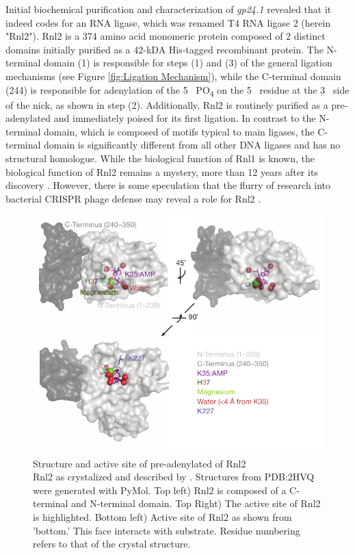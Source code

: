 Initial biochemical purification and characterization of \textit{gp24.1} \citep{Ho2002b} revealed that it indeed codes for an RNA ligase, which was renamed T4 RNA ligase 2 (herein "Rnl2"). Rnl2 is a 374 amino acid monomeric protein composed of 2 distinct domains initially purified as a 42-kDA His-tagged recombinant protein. The N-terminal domain (1) is responsible for steps (1) and (3) of the general ligation mechanisms (see Figure \ref{fig:Ligation Mechanism}), while the C-terminal domain (244) is responsible for adenylation of the 5\textprime~ PO\textsubscript{4} on the 5\textprime~ residue at the 3\textprime~ side of the nick, as shown in step (2). Additionally, Rnl2 is routinely purified as a pre-adenylated and immediately poised for its first ligation. In contrast to the N-terminal domain, which is composed of motifs typical to main ligases, the C-terminal domain is significantly	different from all other DNA ligases and has no structural homologue. While the biological function of Rnl1 is known, the biological function of Rnl2 remains a mystery, more than 12 years after its discovery \citep{Chauleau2013b}. However, there is some speculation that the flurry of research into bacterial CRISPR phage defense may reveal a role for Rnl2 \citep{Barrangou2007c,Chauleau2013b}.

\begin{figure}[htbp]
	\centering 
	\includegraphics{Figures/Rnl2_Structure.pdf}
	\caption[Structure and active site of pre-adenylated of Rnl2]
	{
		Structure and active site of pre-adenylated of Rnl2\\[0.25cm]
		Rnl2 as crystalized and described by \citep{Nandakumar2006}. Structures from PDB:2HVQ were generated with PyMol. Top left) Rnl2 is composed of a C-terminal and N-terminal domain. Top Right) The active site of Rnl2 is highlighted. Bottom left) Active site of Rnl2 as shown from 'bottom.' This face interacts with substrate. Residue numbering refers to that of the crystal structure.
	}
	\label{fig:Rnl2 General Structure}
\end{figure}

